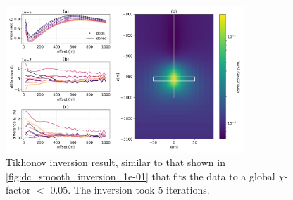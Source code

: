 \begin{figure}
    \begin{center}
    \includegraphics[width=0.8\textwidth]{figures/inversion/dc_smooth_inversion_5e-02.png}
    \end{center}
\caption{
    Tikhonov inversion result, similar to that shown in \ref{fig:dc_smooth_inversion_1e-01}
    that fits the data to a global $\chi$-factor $<$ 0.05. The inversion took 5 iterations.
}
\label{fig:dc_smooth_inversion_5e-02}
\end{figure}

